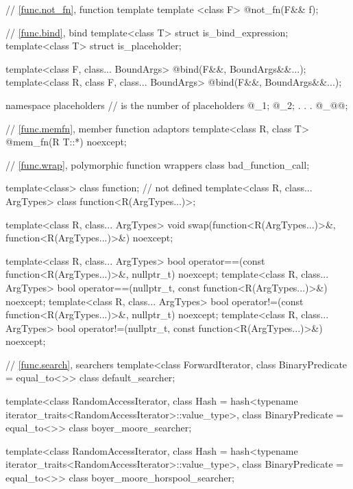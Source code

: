 \begin{codeblock}
{  // \ref{func.not_fn}, function template 
  template <class F>
    @\unspec@ not_fn(F&& f);

  // \ref{func.bind}, bind
  template<class T> struct is_bind_expression;
  template<class T> struct is_placeholder;

  template<class F, class... BoundArgs>
    @\unspec@ bind(F&&, BoundArgs&&...);
  template<class R, class F, class... BoundArgs>
    @\unspec@ bind(F&&, BoundArgs&&...);

  namespace placeholders {
    //  is the  number of placeholders
    @\seebelownc@ _1;
    @\seebelownc@ _2;
               .
               .
               .
    @\seebelownc@ _@@;
  }

  // \ref{func.memfn}, member function adaptors
  template<class R, class T>
    @\unspec@ mem_fn(R T::*) noexcept;

  // \ref{func.wrap}, polymorphic function wrappers
  class bad_function_call;

  template<class> class function; // not defined
  template<class R, class... ArgTypes> class function<R(ArgTypes...)>;

  template<class R, class... ArgTypes>
    void swap(function<R(ArgTypes...)>&, function<R(ArgTypes...)>&) noexcept;

  template<class R, class... ArgTypes>
    bool operator==(const function<R(ArgTypes...)>&, nullptr_t) noexcept;
  template<class R, class... ArgTypes>
    bool operator==(nullptr_t, const function<R(ArgTypes...)>&) noexcept;
  template<class R, class... ArgTypes>
    bool operator!=(const function<R(ArgTypes...)>&, nullptr_t) noexcept;
  template<class R, class... ArgTypes>
    bool operator!=(nullptr_t, const function<R(ArgTypes...)>&) noexcept;

  // \ref{func.search}, searchers
  template<class ForwardIterator, class BinaryPredicate = equal_to<>>
    class default_searcher;

  template<class RandomAccessIterator,
           class Hash = hash<typename iterator_traits<RandomAccessIterator>::value_type>,
           class BinaryPredicate = equal_to<>>
    class boyer_moore_searcher;

  template<class RandomAccessIterator,
           class Hash = hash<typename iterator_traits<RandomAccessIterator>::value_type>,
           class BinaryPredicate = equal_to<>>
    class boyer_moore_horspool_searcher;

}
\end{codeblock}
